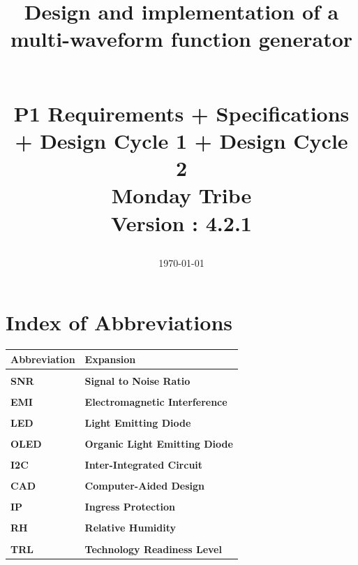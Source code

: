 \documentclass[12pt,a4paper]{article}
\title{
\vspace{7cm}
\textbf{Design and implementation of a multi-waveform function generator}

\\ P1 Requirements + Specifications
\\ + Design Cycle 1 + Design Cycle 2
\\ Monday Tribe
\\ Version : 4.2.1

}
\date{\today}
\begin{document}
\maketitle
\clearpage
\tableofcontents
\clearpage
\listoftables
{}
\clearpage
\listoffigures
{}

\clearpage
\section*{Index of Abbreviations}

\begin{longtable}{@{}p{}p{}@{}}
\textbf{\large Abbreviation} & \textbf{\large Expansion} \\\hline
\\[-0.5em] 
\textbf{SNR} \index{SNR} & \textbf{Signal to Noise Ratio} \index{Signal to Noise Ratio} \\
\\[-0.5em] 
\textbf{EMI} \index{EMI} & \textbf{Electromagnetic Interference} \index{Electromagnetic Interference} \\
\\[-0.5em]  
\textbf{LED} \index{LED} & \textbf{Light Emitting Diode} \index{Light Emitting Diode} \\
\\[-0.5em]  
\textbf{OLED} \index{OLED} & \textbf{Organic Light Emitting Diode} \index{Organic Light Emitting Diode} \\
\\[-0.5em]  
\textbf{I2C} \index{I2C} & \textbf{Inter-Integrated Circuit} \index{Inter-Integrated Circuit} \\
\\[-0.5em]  
\textbf{CAD} \index{CAD} & \textbf{Computer-Aided Design} \index{Computer-Aided Design} \\
\\[-0.5em]  
\textbf{IP} \index{IP} & \textbf{Ingress Protection} \index{Ingress Protection} \\
\\[-0.5em]  
\textbf{RH} \index{RH} & \textbf{Relative Humidity} \index{Relative Humidity} \\
\\[-0.5em]  
\textbf{TRL} \index{TRL} & \textbf{Technology Readiness Level} \index{Technology Readiness Level} \\

\end{longtable}
\end{document}
